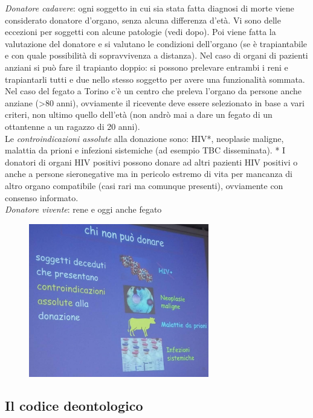 \emph{Donatore cadavere}: ogni soggetto in cui sia stata fatta diagnosi
di morte viene considerato donatore d'organo, senza alcuna differenza
d'età. Vi sono delle eccezioni per soggetti con alcune patologie (vedi
dopo). Poi viene fatta la valutazione del donatore e si valutano le
condizioni dell'organo (se è trapiantabile e con quale possibilità di
sopravvivenza a distanza). Nel caso di organi di pazienti anziani si può
fare il trapianto doppio: si possono prelevare entrambi i reni e
trapiantarli tutti e due nello stesso soggetto per avere una
funzionalità sommata. Nel caso del fegato a Torino c'è un centro che
preleva l'organo da persone anche anziane (\textgreater{}80 anni),
ovviamente il ricevente deve essere selezionato in base a vari criteri,
non ultimo quello dell'età (non andrò mai a dare un fegato di un
ottantenne a un ragazzo di 20 anni).
\\
Le \emph{controindicazioni assolute} alla donazione sono: HIV*,
neoplasie maligne, malattia da prioni e infezioni sistemiche (ad esempio
TBC disseminata). * I donatori di organi HIV positivi possono donare ad
altri pazienti HIV positivi o anche a persone sieronegative ma in
pericolo estremo di vita per mancanza di altro organo compatibile (casi
rari ma comunque presenti), ovviamente con consenso informato.
\\
\emph{Donatore vivente}: rene e oggi anche fegato

\begin{figure}[!ht]
\centering
	\includegraphics[width=0.7\textwidth]{34/image8.jpeg}
	\end{figure}

\subsection{Il codice deontologico}


